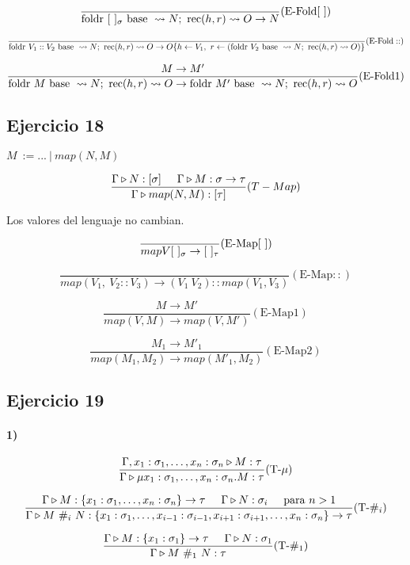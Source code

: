 \documentclass[10pt,a4paper, landscape]{article}
\begin{document}
\vspace*{5mm}
$$\frac{}{\text{foldr } [~]_{\sigma} \text{ base }\leadsto N;~\text{rec}(h, r)\leadsto O\to N}(\text{E-Fold}[~])$$

\vspace*{5mm}
$$\frac{}{\text{foldr } V_1::V_2 \text{ base }\leadsto N;~\text{rec}(h, r)\leadsto O\to O\{h\leftarrow V_1,~r\leftarrow(\text{foldr } V_2 \text{ base }\leadsto N;~\text{rec}(h, r)\leadsto O)\}}(\text{E-Fold}::)$$

\vspace*{5mm}
$$\frac{M\to M'}{\text{foldr } M \text{ base }\leadsto N;~\text{rec}(h, r)\leadsto O\to\text{foldr } M' \text{ base }\leadsto N;~\text{rec}(h, r)\leadsto O}(\text{E-Fold}\text{1})$$


\subsection{Ejercicio 18}
\begin{multicols}{2}
$M~:= ...~|~map(N,M)$

$$\frac{\Gamma\triangleright N : [\sigma]\hspace*{5mm}\Gamma\triangleright M : \sigma\to\tau}{\Gamma\triangleright map(N,M) : [\tau]}(T-Map)$$

\vspace*{5mm}
Los valores del lenguaje no cambian.

\vspace*{5mm}
$$\frac{}{map{V}{[~]_{\sigma}}\to [~]_{\tau}}(\text{E-Map}[~])$$

\vspace*{5mm}
$$\frac{}{map(V_1,~V_2 :: V_3)\to (V_1~V_2)::map(V_1,V_3)}(\text{E-Map}::)$$

\vspace*{5mm}
$$\frac{M\to M'}{map(V, M)\to map(V,M')}(\text{E-Map1})$$

\vspace*{5mm}
$$\frac{M_1\to M'_1}{map(M_1, M_2)\to map(M'_1,M_2)}(\text{E-Map2})$$
\end{multicols}

\newpage
\subsection{Ejercicio 19}
\paragraph{1)}
\begin{multicols}{2}
$$\frac{\Gamma,x_1:\sigma_1,\dots,x_n:\sigma_n\triangleright M : \tau}{\Gamma\triangleright \mu x_1:\sigma_1,\dots,x_n:\sigma_n.M : \tau}(\text{T-}\mu)$$

\vspace*{5mm}
$$\frac{\Gamma\triangleright M : \{x_1:\sigma_1,\dots,x_n:\sigma_n\}\to\tau\hspace*{5mm}\Gamma\triangleright N : \sigma_i\hspace*{5mm}\text{para } n > 1}{\Gamma\triangleright M~\#_i~N : \{x_1:\sigma_1,\dots,x_{i-1}:\sigma_{i-1},x_{i+1}:\sigma_{i+1},\dots,x_n:\sigma_n\}\to\tau}(\text{T-}\#_i)$$

\vspace*{5mm}
$$\frac{\Gamma\triangleright M : \{x_1:\sigma_1\}\to\tau\hspace*{5mm}\Gamma\triangleright N : \sigma_1}{\Gamma\triangleright M~\#_1~N : \tau}(\text{T-}\#_1)$$
\end{multicols}
\end{document}
